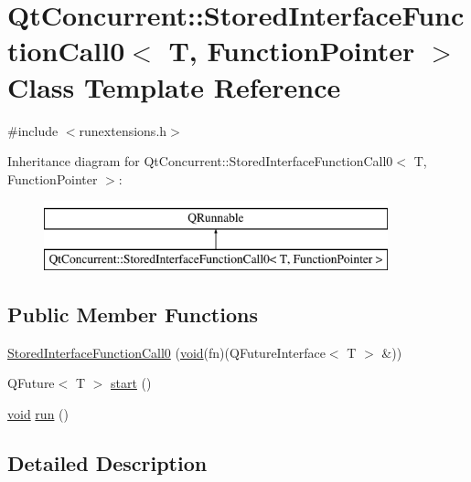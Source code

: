 \hypertarget{class_qt_concurrent_1_1_stored_interface_function_call0}{\section{Qt\-Concurrent\-:\-:Stored\-Interface\-Function\-Call0$<$ T, Function\-Pointer $>$ Class Template Reference}
\label{class_qt_concurrent_1_1_stored_interface_function_call0}
}


{\ttfamily \#include $<$runextensions.\-h$>$}

Inheritance diagram for Qt\-Concurrent\-:\-:Stored\-Interface\-Function\-Call0$<$ T, Function\-Pointer $>$\-:\begin{figure}[H]
\begin{center}
\leavevmode
\includegraphics[height=2.000000cm]{class_qt_concurrent_1_1_stored_interface_function_call0}
\end{center}
\end{figure}
\subsection*{Public Member Functions}
\begin{DoxyCompactItemize}
\item 
\hyperlink{class_qt_concurrent_1_1_stored_interface_function_call0_a128bcc2e778675fbc138f3220eccdd30}{Stored\-Interface\-Function\-Call0} (\hyperlink{group___u_a_v_objects_plugin_ga444cf2ff3f0ecbe028adce838d373f5c}{void}(fn)(Q\-Future\-Interface$<$ T $>$ \&))
\item 
Q\-Future$<$ T $>$ \hyperlink{class_qt_concurrent_1_1_stored_interface_function_call0_a1a695cd6ebe4a05504b5bcdca972e993}{start} ()
\item 
\hyperlink{group___u_a_v_objects_plugin_ga444cf2ff3f0ecbe028adce838d373f5c}{void} \hyperlink{class_qt_concurrent_1_1_stored_interface_function_call0_a647bd9e33e528df7a45f933efa4c0d14}{run} ()
\end{DoxyCompactItemize}


\subsection{Detailed Description}

